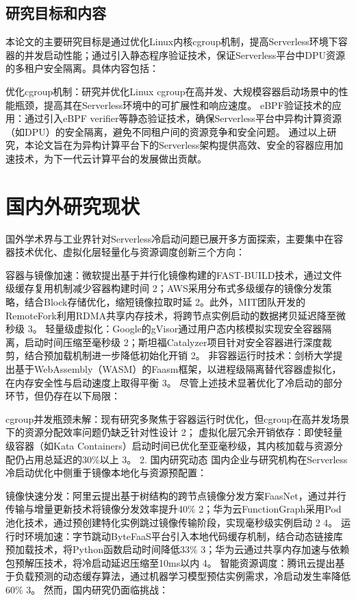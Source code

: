\subsection{研究目标和内容}
本论文的主要研究目标是通过优化Linux内核cgroup机制，提高Serverless环境下容器的并发启动性能；通过引入静态程序验证技术，保证Serverless平台中DPU资源的多租户安全隔离。具体内容包括：

优化cgroup机制：研究并优化Linux cgroup在高并发、大规模容器启动场景中的性能瓶颈，提高其在Serverless环境中的可扩展性和响应速度。
eBPF验证技术的应用：通过引入eBPF verifier等静态验证技术，确保Serverless平台中异构计算资源（如DPU）的安全隔离，避免不同租户间的资源竞争和安全问题。
通过以上研究，本论文旨在为异构计算平台下的Serverless架构提供高效、安全的容器应用加速技术，为下一代云计算平台的发展做出贡献。

\section{国内外研究现状}

国外学术界与工业界针对Serverless冷启动问题已展开多方面探索，主要集中在容器技术优化、虚拟化层轻量化与资源调度创新三个方向：

容器与镜像加速：微软提出基于并行化镜像构建的FAST-BUILD技术，通过文件级缓存复用机制减少容器构建时间 2；AWS采用分布式多级缓存的镜像分发策略，结合Block存储优化，缩短镜像拉取时延 2。此外，MIT团队开发的RemoteFork利用RDMA共享内存技术，将跨节点实例启动的数据拷贝延迟降至微秒级 3。
轻量级虚拟化：Google的gVisor通过用户态内核模拟实现安全容器隔离，启动时间压缩至毫秒级 2；斯坦福Catalyzer项目针对安全容器进行深度裁剪，结合预加载机制进一步降低初始化开销 2。
非容器运行时技术：剑桥大学提出基于WebAssembly（WASM）的Faasm框架，以进程级隔离替代容器虚拟化，在内存安全性与启动速度上取得平衡 3。
尽管上述技术显著优化了冷启动的部分环节，但仍存在以下局限：

cgroup并发瓶颈未解：现有研究多聚焦于容器运行时优化，但cgroup在高并发场景下的资源分配效率问题仍缺乏针对性设计 2；
虚拟化层冗余开销依存：即使轻量级容器（如Kata Containers）启动时间已优化至亚毫秒级，其内核加载与资源分配仍占用总延迟的30\%以上 3。
2. 国内研究动态
国内企业与研究机构在Serverless冷启动优化中侧重于镜像本地化与资源预配置：

镜像快速分发：阿里云提出基于树结构的跨节点镜像分发方案FaasNet，通过并行传输与增量更新技术将镜像分发效率提升40\% 2；华为云FunctionGraph采用Pod池化技术，通过预创建特化实例跳过镜像传输阶段，实现毫秒级实例启动 2 4。
运行时环境加速：字节跳动ByteFaaS平台引入本地代码缓存机制，结合动态链接库预加载技术，将Python函数启动时间降低33\% 3；华为云通过共享内存加速与依赖包预解压技术，将冷启动延迟压缩至10ms以内 4。
智能资源调度：腾讯云提出基于负载预测的动态缓存算法，通过机器学习模型预估实例需求，冷启动发生率降低60\% 3。
然而，国内研究仍面临挑战：

